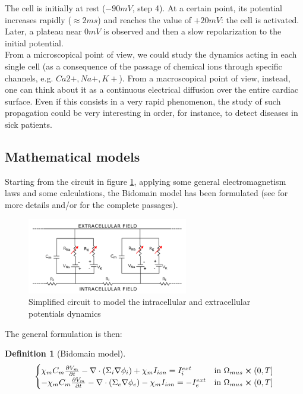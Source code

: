 \documentclass[a4paper,12pt]{article}
\newtheorem{definition}{Definition}
\begin{document}
    \noindent The cell is initially at rest ($-90mV$, step 4). At a certain point, its potential increases rapidly ($\approx2ms$) and reaches the value of $+20mV$: the cell is activated. Later, a plateau near $0mV$ is observed and then a slow repolarization to the initial potential. \\
    From a microscopical point of view, we could study the dynamics acting in each single cell (as a consequence of the passage of chemical ions through specific channels, e.g. $Ca2+,Na+,K+$). From a macroscopical point of view, instead, one can think about it as a continuous electrical diffusion over the entire cardiac surface. Even if this consists in a very rapid phenomenon, the study of such propagation could be very interesting in order, for instance, to detect diseases in sick patients.
    
    \subsection{Mathematical models}
    Starting from the circuit in figure \ref{electrical_circuit}, applying some general electromagnetism laws and some calculations, the Bidomain model has been formulated (see \parencite{acta} for more details and/or \parencite{colli_franzone} for the complete passages).
    
    \begin{figure}[h]
    	\begin{center}
    		\includegraphics[width = 7cm]{./electrical_circuit.png}
    		\caption{Simplified circuit to model the intracellular and extracellular potentials dynamics}
    		\label{electrical_circuit}
    	\end{center}
    \end{figure}
    
    \noindent The general formulation is then: \vspace{3mm}
    \begin{definition}[Bidomain model]
	\begin{equation*}
	\begin{cases}
	\chi_m C_m\pdv{V_m}{t} - \nabla \cdot (\Sigma_i \nabla \phi_i) + \chi_m I_{ion} = I_i^{ext}    & \text{in } \Omega_{mus} \cross (0,T]
	\\
	-\chi_m C_m\pdv{V_m}{t} - \nabla \cdot (\Sigma_e \nabla \phi_e) - \chi_m I_{ion} = -I_e^{ext}    & \text{in } \Omega_{mus} \cross (0,T]
	\end{cases}
	\end{equation*}
    \end{definition}
	\vspace{3mm}
	
\end{document}
